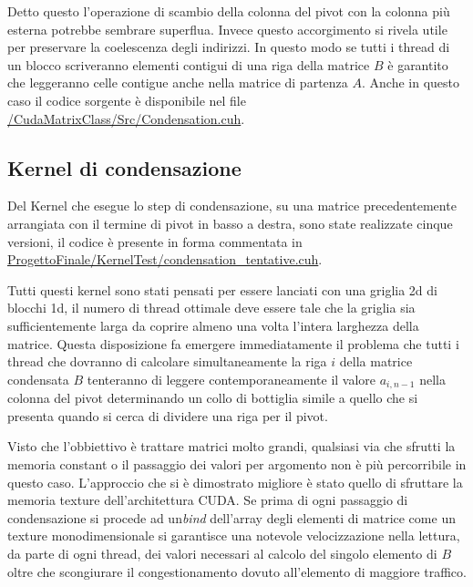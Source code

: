 \documentclass{article}
\begin{document}
Detto questo l'operazione di scambio della colonna del pivot con la colonna più esterna potrebbe sembrare superflua. Invece questo accorgimento si rivela utile per preservare la coelescenza degli indirizzi. In questo modo se tutti i thread di un blocco scriveranno elementi contigui di una riga della matrice $B$ è garantito che leggeranno celle contigue anche nella matrice di partenza $A$.
\newline
Anche in questo caso il codice sorgente  è disponibile nel file \url{/CudaMatrixClass/Src/Condensation.cuh}.


\subsection{Kernel di condensazione}
Del Kernel che esegue lo step di condensazione, su una matrice precedentemente arrangiata con il termine di pivot in basso a destra, sono state realizzate cinque versioni, il codice è presente in forma commentata in \url{ProgettoFinale/KernelTest/condensation_tentative.cuh}.

Tutti questi kernel sono stati pensati per  essere lanciati con una griglia 2d di blocchi 1d, il numero di thread ottimale deve essere tale che la griglia sia sufficientemente larga da coprire almeno una volta l'intera larghezza della matrice.
Questa disposizione fa emergere immediatamente il problema che tutti i thread che dovranno di calcolare simultaneamente la riga $i$ della matrice condensata $B$ tenteranno di leggere contemporaneamente il valore $a_{i,n-1}$ nella colonna del pivot determinando un collo di bottiglia simile a quello che si presenta quando si cerca di dividere  una riga per il pivot.

Visto che l'obbiettivo è trattare matrici molto grandi, qualsiasi via che sfrutti la memoria constant o il passaggio dei valori per argomento non è più percorribile in questo caso.
L'approccio che si è dimostrato migliore è stato quello di sfruttare la memoria texture dell'architettura CUDA. 
Se prima di ogni passaggio di condensazione si procede ad un\emph{bind} dell'array degli elementi di matrice come un texture monodimensionale si garantisce una notevole velocizzazione nella lettura, da parte di ogni thread, dei valori necessari al calcolo del singolo elemento di $B$ oltre che scongiurare il congestionamento dovuto all'elemento di maggiore traffico.
\end{document}
